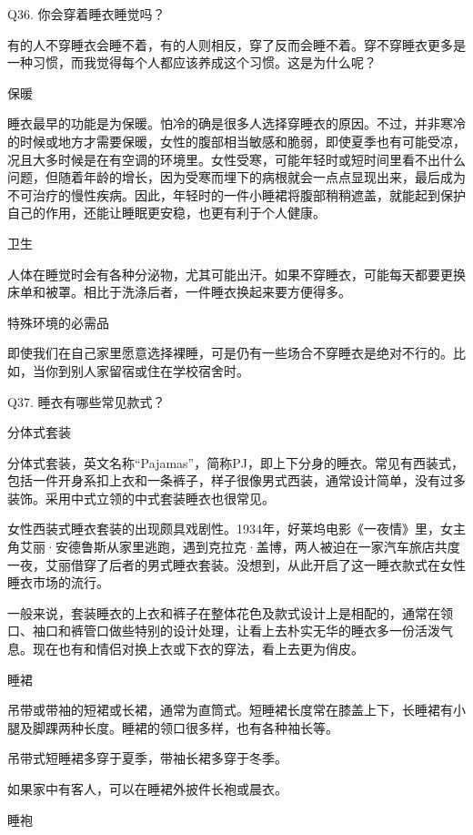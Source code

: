 \documentclass[12pt,UTF8]{ctexbook}
\begin{document}
Q36. 你会穿着睡衣睡觉吗？


有的人不穿睡衣会睡不着，有的人则相反，穿了反而会睡不着。穿不穿睡衣更多是一种习惯，而我觉得每个人都应该养成这个习惯。这是为什么呢？

保暖

睡衣最早的功能是为保暖。怕冷的确是很多人选择穿睡衣的原因。不过，并非寒冷的时候或地方才需要保暖，女性的腹部相当敏感和脆弱，即使夏季也有可能受凉，况且大多时候是在有空调的环境里。女性受寒，可能年轻时或短时间里看不出什么问题，但随着年龄的增长，因为受寒而埋下的病根就会一点点显现出来，最后成为不可治疗的慢性疾病。因此，年轻时的一件小睡裙将腹部稍稍遮盖，就能起到保护自己的作用，还能让睡眠更安稳，也更有利于个人健康。

卫生

人体在睡觉时会有各种分泌物，尤其可能出汗。如果不穿睡衣，可能每天都要更换床单和被罩。相比于洗涤后者，一件睡衣换起来要方便得多。

特殊环境的必需品

即使我们在自己家里愿意选择裸睡，可是仍有一些场合不穿睡衣是绝对不行的。比如，当你到别人家留宿或住在学校宿舍时。





Q37. 睡衣有哪些常见款式？


分体式套装

分体式套装，英文名称“Pajamas”，简称PJ，即上下分身的睡衣。常见有西装式，包括一件开身系扣上衣和一条裤子，样子很像男式西装，通常设计简单，没有过多装饰。采用中式立领的中式套装睡衣也很常见。

女性西装式睡衣套装的出现颇具戏剧性。1934年，好莱坞电影《一夜情》里，女主角艾丽·安德鲁斯从家里逃跑，遇到克拉克·盖博，两人被迫在一家汽车旅店共度一夜，艾丽借穿了后者的男式睡衣套装。没想到，从此开启了这一睡衣款式在女性睡衣市场的流行。

一般来说，套装睡衣的上衣和裤子在整体花色及款式设计上是相配的，通常在领口、袖口和裤管口做些特别的设计处理，让看上去朴实无华的睡衣多一份活泼气息。现在也有和情侣对换上衣或下衣的穿法，看上去更为俏皮。



睡裙



吊带或带袖的短裙或长裙，通常为直筒式。短睡裙长度常在膝盖上下，长睡裙有小腿及脚踝两种长度。睡裙的领口很多样，也有各种袖长等。

吊带式短睡裙多穿于夏季，带袖长裙多穿于冬季。

如果家中有客人，可以在睡裙外披件长袍或晨衣。

睡袍
\end{document}

